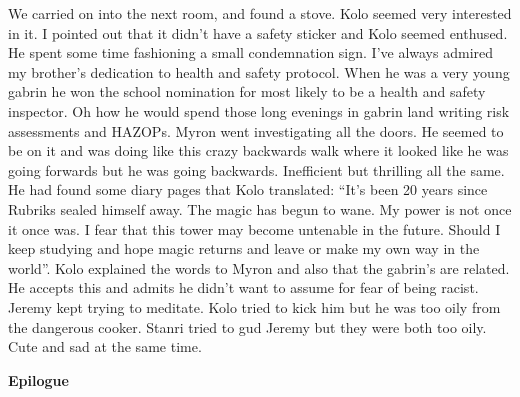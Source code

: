 \begin{multicols}{2}
We carried on into the next room, and found a stove. Kolo seemed very interested in it. I pointed out that it didn’t have a safety sticker and Kolo seemed enthused. He spent some time fashioning a small condemnation sign. I’ve always admired my brother’s dedication to health and safety protocol. When he was a very young gabrin he won the school nomination for most likely to be a health and safety inspector. Oh how he would spend those long evenings in gabrin land writing risk assessments and HAZOPs. Myron went investigating all the doors. He seemed to be on it and was doing like this crazy backwards walk where it looked like he was going forwards but he was going backwards. Inefficient but thrilling all the same. He had found some diary pages that Kolo translated: “It’s been 20 years since Rubriks sealed himself away. The magic has begun to wane. My power is not once it once was. I fear that this tower may become untenable in the future. Should I keep studying and hope magic returns and leave or make my own way in the world”. Kolo explained the words to Myron and also that the gabrin’s are related. He accepts this and admits he didn’t want to assume for fear of being racist. Jeremy kept trying to meditate. Kolo tried to kick him but he was too oily from the dangerous cooker. Stanri tried to gud Jeremy but they were both too oily. Cute and sad at the same time.\medskip

\textbf{Epilogue}\medskip


\end{multicols}
